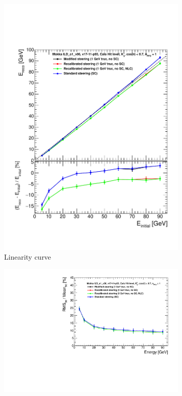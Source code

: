 \begin{figure}
  \centering
  \begin{subfigure}[t]{0.45\textwidth}
    \centering
    \includegraphics[width=\linewidth]{chap6/fig_TimingILD/Comparison_linearity_Curves_Hits}
    \caption{Linearity curve} \label{fig:linhits}
  \end{subfigure}
  \hfill
  \begin{subfigure}[t]{0.45\textwidth}
    \centering
    \includegraphics[width=\linewidth]{chap6/fig_TimingILD/Comparison_resolution_Curves_Hits}

\end{subfigure}
\end{figure}
